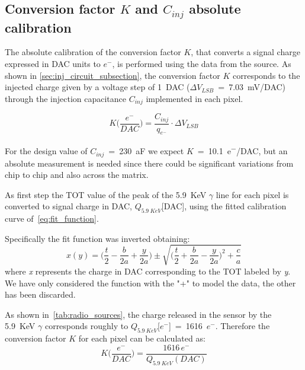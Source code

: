 
\subsection{Conversion factor $K$ and $C_{inj}$ absolute calibration}
\label{sec:inj_cap_calib}

The absolute calibration of the conversion factor $K$, that converts a signal charge expressed in DAC units to $e^{-}$, is performed using the data from the  source. 
As shown in \autoref{sec:inj_circuit_subsection}, the conversion factor $K$ corresponds to the injected charge given by a voltage step of \SI{1}{DAC} ($\Delta V_{LSB}$~=~\SI{7.03}{\milli V/DAC}) through the injection capacitance $C_{inj}$ implemented in each pixel. 

\begin{equation}
K\bigg(\frac{e^{-}}{DAC}\bigg) = \frac{C_{inj}}{q_{e^{-}}} \cdot \Delta V_{LSB} 
\end{equation}

For the design value of $C_{inj}$~=~\SI{230}{aF} we expect $K$~=~\SI{10.1}{e^{-}/DAC}, but an absolute measurement is needed since there could be significant variations from chip to chip and also across the matrix.

As first step the TOT value of the peak of the \SI{5.9}{KeV} $\gamma$ line for each pixel is converted to signal charge in DAC, $Q_{\SI{5.9}{KeV}}$[DAC], using the fitted calibration curve of~\autoref{eq:fit_function}.

Specifically the fit function was inverted obtaining:
\begin{equation}
x(y) = \bigg(\frac{t}{2} - \frac{b}{2a} + \frac{y}{2a}\bigg) \pm \sqrt{\bigg(\frac{t}{2} + \frac{b}{2a} - \frac{y}{2a}\bigg)^{2} + \frac{c}{a}}
\end{equation}
where \textit{x} represents the charge in DAC corresponding to the TOT labeled by \textit{y}. We have only considered the function with the "+" to model the data, the other has been discarded.

As shown in~\autoref{tab:radio_sources}, the charge released in the sensor by the \SI{5.9}{KeV} $\gamma$ corresponds roughly to $Q_{\SI{5.9}{KeV}}$[$e^{-}$]~=~1616~$e^{-}$. Therefore the conversion factor $K$ for each pixel can be calculated as:
\begin{equation}
K\bigg(\frac{e^{-}}{DAC}\bigg) = \frac{1616 \, e^{-}}{Q_{\SI{5.9}{KeV}}(DAC)}
\label{eq:inj_cap}
\end{equation} 

